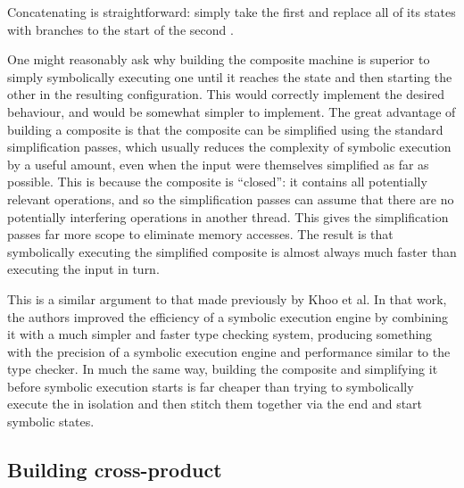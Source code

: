 
Concatenating {\StateMachines} is straightforward: simply take the
first {\StateMachine} and replace all of its {\stSurvive} states
with branches to the start of the second {\StateMachine}.

 One might reasonably ask why building the
composite machine is superior to simply symbolically executing one
{\StateMachine} until it reaches the {\stSurvive} state and then
starting the other {\StateMachine} in the resulting configuration.
This would correctly implement the desired behaviour, and would be
somewhat simpler to implement.  The great advantage of building a
composite {\StateMachine} is that the composite {\StateMachine} can be
simplified using the standard {\StateMachine} simplification passes,
which usually reduces the complexity of symbolic execution by a useful
amount, even when the input {\StateMachines} were themselves
simplified as far as possible.  This is because the composite
{\StateMachine} is ``closed'': it contains all potentially relevant
operations, and so the simplification passes can assume that there are
no potentially interfering operations in another thread.  This gives
the simplification passes far more scope to eliminate memory accesses.
The result is that symbolically executing the simplified composite
{\StateMachine} is almost always much faster than executing the input
{\StateMachines} in turn.

This is a similar argument to that made previously by Khoo et
al\cite{Khoo2010}.  In that work, the authors improved the efficiency
of a symbolic execution engine by combining it with a much simpler and
faster type checking system, producing something with the precision of
a symbolic execution engine and performance similar to the type
checker.  In much the same way, building the composite {\StateMachine}
and simplifying it before symbolic execution starts is far cheaper
than trying to symbolically execute the {\StateMachines} in isolation
and then stitch them together via the end and start symbolic states.


\subsection{Building cross-product {\StateMachines}}
\label{sect:using:build_cross_product}

